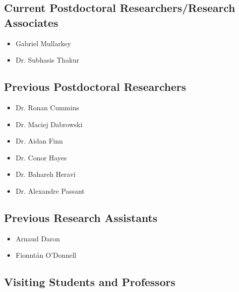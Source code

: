 \documentclass[10pt,a4paper]{res} %
\begin{document}
\begin{resume}
\subsection*{Current Postdoctoral Researchers/Research Associates}

\begin{itemize} \itemsep -2pt
\item Gabriel Mullarkey
\item Dr. Subhasis Thakur
\end{itemize}

\subsection*{Previous Postdoctoral Researchers}

\begin{itemize} \itemsep -2pt
\item Dr. Ronan Cummins
\item Dr. Maciej Dabrowski
\item Dr. Aidan Finn
\item Dr. Conor Hayes
\item Dr. Bahareh Heravi
\item Dr. Alexandre Passant
\end{itemize}

\subsection*{Previous Research Assistants}

\begin{itemize} \itemsep -2pt
\item Arnaud Daron
\item Fionnt\'{a}n O'Donnell
\end{itemize}

\subsection*{Visiting Students and Professors}


\end{resume}
\end{document}

